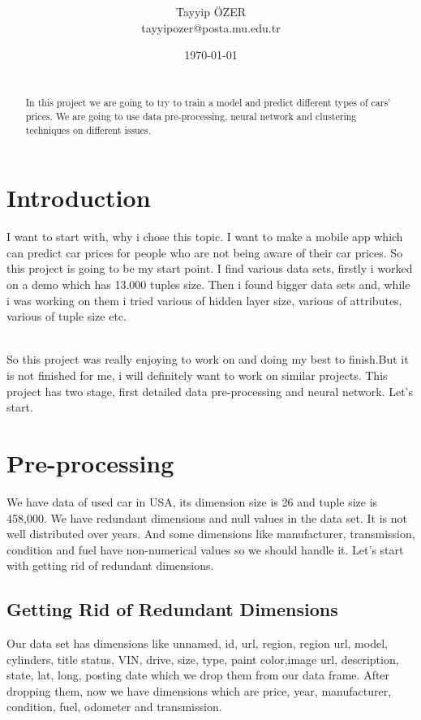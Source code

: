 \documentclass[onecolumn]{article}
\title{\spacecaps{Project Report}\\ \normalsize \spacesc{CENG 3521, Data Mining} }
\author{Tayyip ÖZER\\tayyipozer@posta.mu.edu.tr}
\date{\today}
\begin{document}
\maketitle

\begin{abstract}
\\In this project we are going to try to train a model and predict different types of cars' prices. We are going to use data pre-processing, neural network and clustering techniques on different issues. 
\\
\end{abstract}


\section{Introduction}
I want to start with, why i chose this topic. I want to make a mobile app which can predict car prices for people who are not being aware of their car prices. So this project is going to be my start point. I find various data sets, firstly i worked on a demo which has 13.000 tuples size. Then i found bigger data sets and, while i was working on them i tried various of hidden layer size, various of attributes, various of tuple size etc. 

\\So this project was really enjoying to work on and doing my best to finish.But it is not finished for me, i will definitely want to work on similar projects. This project has two stage, first detailed data pre-processing and neural network. Let's start. 


\section{Pre-processing}
We have data of used car in USA, its dimension size is 26 and tuple size is 458,000. We have redundant dimensions and null values in the data set. It is not well distributed over years. And some dimensions like manufacturer, transmission, condition and fuel have non-numerical values so we should handle it. Let's start with getting rid of redundant dimensions. 

\subsection{Getting Rid of Redundant Dimensions}
Our data set has dimensions like unnamed, id, url, region, region url, model, cylinders, title status, VIN, drive, size, type, paint color,image url, description, state, lat, long, posting date which we drop them from our data frame. After dropping them, now we have dimensions which are price, year, manufacturer, condition, fuel, odometer and transmission.
\\
\end{document}
